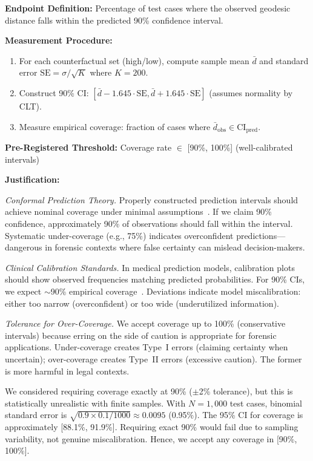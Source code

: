 \textbf{Endpoint Definition:} Percentage of test cases where the observed geodesic distance falls within the predicted 90\% confidence interval.

\textbf{Measurement Procedure:}
\begin{enumerate}
\item For each counterfactual set (high/low), compute sample mean $\bar{d}$ and standard error $\text{SE} = \sigma / \sqrt{K}$ where $K=200$.
\item Construct 90\% CI: $[\bar{d} - 1.645 \cdot \text{SE}, \bar{d} + 1.645 \cdot \text{SE}]$ (assumes normality by CLT).
\item Measure empirical coverage: fraction of cases where $\bar{d}_{\text{obs}} \in \text{CI}_{\text{pred}}$.
\end{enumerate}

\textbf{Pre-Registered Threshold:} Coverage rate $\in$ [90\%, 100\%] (well-calibrated intervals)

\textbf{Justification:}

\textit{Conformal Prediction Theory.} Properly constructed prediction intervals should achieve nominal coverage under minimal assumptions~\cite{vovk2005algorithmic}. If we claim 90\% confidence, approximately 90\% of observations should fall within the interval. Systematic under-coverage (e.g., 75\%) indicates overconfident predictions—dangerous in forensic contexts where false certainty can mislead decision-makers.

\textit{Clinical Calibration Standards.} In medical prediction models, calibration plots should show observed frequencies matching predicted probabilities. For 90\% CIs, we expect $\sim$90\% empirical coverage~\cite{steyerberg2009clinical}. Deviations indicate model miscalibration: either too narrow (overconfident) or too wide (underutilized information).

\textit{Tolerance for Over-Coverage.} We accept coverage up to 100\% (conservative intervals) because erring on the side of caution is appropriate for forensic applications. Under-coverage creates Type~I errors (claiming certainty when uncertain); over-coverage creates Type~II errors (excessive caution). The former is more harmful in legal contexts.

We considered requiring coverage exactly at 90\% ($\pm$2\% tolerance), but this is statistically unrealistic with finite samples. With $N=1,000$ test cases, binomial standard error is $\sqrt{0.9 \times 0.1 / 1000} \approx 0.0095$ (0.95\%). The 95\% CI for coverage is approximately [88.1\%, 91.9\%]. Requiring exact 90\% would fail due to sampling variability, not genuine miscalibration. Hence, we accept any coverage in [90\%, 100\%].

